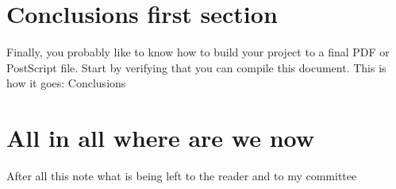 \section{Conclusions first section}
Finally, you probably like to know how to build your project to a
final PDF or PostScript file. Start by verifying that you can
compile this document. This is how it goes:
Conclusions
\section{All in all where are we now}
After all this note what is being left to the reader and to my committee
%
%
%
%
%
%
%
%
